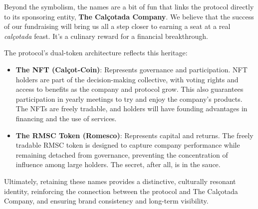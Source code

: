 \documentclass[conference]{IEEEtran}
\begin{document}
Beyond the symbolism, the names are a bit of fun that links the protocol directly to its sponsoring entity, \textbf{The Calçotada Company}. We believe that the success of our fundraising will bring us all a step closer to earning a seat at a real \textit{calçotada} feast. It's a culinary reward for a financial breakthrough.

The protocol's dual-token architecture reflects this heritage:
\begin{itemize}
    \item \textbf{The NFT (Calçot-Coin)}: Represents governance and participation. NFT holders are part of the decision-making collective, with voting rights and access to benefits as the company and protocol grow. This also guarantees participation in yearly meetings to try and enjoy the company’s products. The NFTs are freely tradable, and holders will have founding advantages in financing and the use of services.
    \item \textbf{The RMSC Token (Romesco)}: Represents capital and returns. The freely tradable RMSC token is designed to capture company performance while remaining detached from governance, preventing the concentration of influence among large holders. The secret, after all, is in the sauce.
\end{itemize}

Ultimately, retaining these names provides a distinctive, culturally resonant identity, reinforcing the connection between the protocol and The Calçotada Company, and ensuring brand consistency and long-term visibility.


\end{document}
